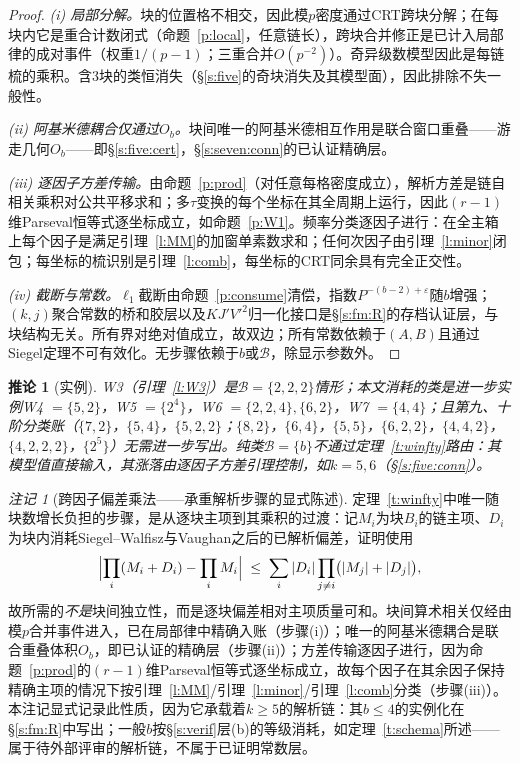 \documentclass[11pt]{article}
\numberwithin{equation}{section}
\newtheorem{corollary}[theorem]{推论}
\theoremstyle{definition}
\theoremstyle{remark}
\newtheorem{remark}[theorem]{注记}
\begin{document}
\begin{proof}
\emph{(i) 局部分解。}块的位置格不相交，因此模$p$密度通过CRT跨块分解；在每块内它是重合计数闭式（命题~\ref{p:local}，任意链长），跨块合并修正是已计入局部律的成对事件（权重$1/(p-1)$；三重合并$O(p^{-2})$）。奇异级数模型因此是每链梳的乘积。含$3$块的类恒消失（\S\ref{s:five}的奇块消失及其模型面），因此排除不失一般性。

\emph{(ii) 阿基米德耦合仅通过$O_b$。}块间唯一的阿基米德相互作用是联合窗口重叠——游走几何$O_b$——即\S\ref{s:five:cert}，\S\ref{s:seven:conn}的已认证精确层。

\emph{(iii) 逐因子方差传输。}由命题~\ref{p:prod}（对任意每格密度成立），解析方差是链自相关乘积对公共平移求和；多$\tau$变换的每个坐标在其全周期上运行，因此$(r{-}1)$维Parseval恒等式逐坐标成立，如命题~\ref{p:W1}。频率分类逐因子进行：在全主箱上每个因子是满足引理~\ref{l:MM}的加窗单素数求和；任何次因子由引理~\ref{l:minor}闭包；每坐标的梳识别是引理~\ref{l:comb}，每坐标的CRT同余具有完全正交性。

\emph{(iv) 截断与常数。}$\ell_1$截断由命题~\ref{p:consume}清偿，指数$P^{-(b-2)+\varepsilon}$随$b$增强；$(k,j)$聚合常数的桥和胶层以及$KJ'V'^2$归一化接口是\S\ref{s:fm:R}的存档认证层，与块结构无关。所有界对绝对值成立，故双边；所有常数依赖于$(A,B)$且通过Siegel定理不可有效化。无步骤依赖于$b$或$\mathcal B$，除显示参数外。
\end{proof}

\begin{corollary}[实例]\label{c:winst}
W3（引理~\ref{l:W3}）是$\mathcal B=\{2,2,2\}$情形；本文消耗的类是进一步实例\emph{W4} $=\{5,2\}$，\emph{W5} $=\{2^4\}$，\emph{W6} $=\{2,2,4\},\{6,2\}$，\emph{W7} $=\{4,4\}$；且第九、十阶分类账（$\{7,2\}$，$\{5,4\}$，$\{5,2,2\}$；$\{8,2\}$，$\{6,4\}$，$\{5,5\}$，$\{6,2,2\}$，$\{4,4,2\}$，$\{4,2,2,2\}$，$\{2^5\}$）无需进一步写出。纯类$\mathcal B=\{b\}$不通过定理~\ref{t:winfty}路由：其模型值直接输入，其涨落由逐因子方差引理控制，如$k=5,6$（\S\ref{s:five:conn}）。
\end{corollary}

\begin{remark}[跨因子偏差乘法——承重解析步骤的显式陈述]\label{r:transport}
定理~\ref{t:winfty}中唯一随块数增长负担的步骤，是从逐块主项到其乘积的过渡：记$M_i$为块$B_i$的链主项、$D_i$为块内消耗Siegel--Walfisz与Vaughan之后的已解析偏差，证明使用
\[
\Bigl|\prod_i(M_i+D_i)-\prod_iM_i\Bigr|
\;\le\;\sum_i|D_i|\prod_{j\ne i}\bigl(|M_j|+|D_j|\bigr),
\]
故所需的\emph{不是}块间独立性，而是逐块偏差相对主项质量可和。块间算术相关仅经由模$p$合并事件进入，已在局部律中精确入账（步骤(i)）；唯一的阿基米德耦合是联合重叠体积$O_b$，即已认证的精确层（步骤(ii)）；方差传输逐因子进行，因为命题~\ref{p:prod}的$(r{-}1)$维Parseval恒等式逐坐标成立，故每个因子在其余因子保持精确主项的情况下按引理~\ref{l:MM}/引理~\ref{l:minor}/引理~\ref{l:comb}分类（步骤(iii)）。本注记显式记录此性质，因为它承载着$k\ge5$的解析链：其$b\le4$的实例化在\S\ref{s:fm:R}中写出；一般$b$按\S\ref{s:verif}层(b)的等级消耗，如定理~\ref{t:schema}所述——属于待外部评审的解析链，不属于已证明常数层。
\end{remark}
\end{document}
